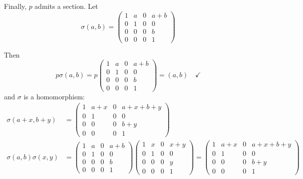 \documentclass[12pt]{article}
\begin{document}
        Finally, $p$ admits a section. Let 
        \[\sigma(a, b) = \begin{pmatrix}
            1 & a & 0 & a+b\\ 
            0 & 1 & 0 & 0\\ 
            0 & 0 & 0 & b\\ 
            0 & 0 & 0 & 1
        \end{pmatrix}\]

        Then 
        \[p\sigma(a, b) = p\begin{pmatrix}
            1 & a & 0 & a+b\\ 
            0 & 1 & 0 & 0\\ 
            0 & 0 & 0 & b\\ 
            0 & 0 & 0 & 1
        \end{pmatrix} = (a, b) \quad \checkmark\]
        and $\sigma$ is a homomorphism: 
        \begin{align*}
            \sigma(a + x, b+y) &= \begin{pmatrix}
                1 & a+x & 0 & a+x+b+y\\ 
                0 & 1 & 0 & 0\\ 
                0 & 0 & 0 & b+y\\ 
                0 & 0 & 0 & 1
            \end{pmatrix}\\ 
            \sigma(a, b)\sigma(x, y) &= \begin{pmatrix}
                1 & a & 0 & a+b\\ 
                0 & 1 & 0 & 0\\ 
                0 & 0 & 0 & b\\ 
                0 & 0 & 0 & 1
            \end{pmatrix}\begin{pmatrix}
                1 & x & 0 & x+y\\ 
                0 & 1 & 0 & 0\\ 
                0 & 0 & 0 & y\\ 
                0 & 0 & 0 & 1
            \end{pmatrix} = \begin{pmatrix}
                1 & a+x & 0 & a+x+b+y\\ 
                0 & 1 & 0 & 0\\ 
                0 & 0 & 0 & b+y\\ 
                0 & 0 & 0 & 1
            \end{pmatrix}
        \end{align*}
    \color{black}
\end{document}
